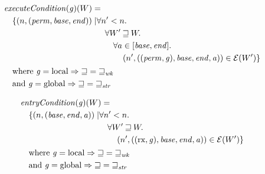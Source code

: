 \documentclass[a4paper]{article}
\newcommand{\var}[1]{\mathit{#1}}
\newcommand{\gl}{\var{g}}
\newcommand{\addr}{\var{a}}
\newcommand{\start}{\var{base}}
\newcommand{\addrend}{\var{end}}
\newcommand{\perm}{\var{perm}}
\newcommand{\plainfun}[2]{
  \ifthenelse{\equal{#2}{}}
             {\mathit{#1}}
             {\mathit{#1}(#2)}
}
\newcommand{\execCond}[1]{\plainfun{executeCondition}{#1}}
\newcommand{\entryCond}[1]{\plainfun{entryCondition}{#1}}
\newcommand{\future}{\mathbin{\sqsupseteq}}
\newcommand{\futurewk}{\mathbin{\sqsupseteq}_{\var{wk}}}
\newcommand{\futurestr}{\mathbin{\sqsupseteq}_{\var{str}}}
\newcommand{\asmType}{\plaindom{AsmType}}
\newcommand{\plaindom}[1]{\mathrm{#1}}
\newcommand{\intr}[2]{\mathcal{#1}}
\newcommand{\exprintr}[1]{\intr{E}{#1}}
\newcommand{\stder}{\exprintr{\asmType}}
\newcommand{\npair}[2][n]{\left(#1,#2 \right)}
\newcommand{\plainperm}[1]{\mathrm{#1}}
\newcommand{\exec}{\plainperm{rx}}
\newcommand{\local}{\plainperm{local}}
\newcommand{\glob}{\plainperm{global}}
\begin{document}
\begin{align*}
  & \execCond{}(\gl)(W) = \\
  & \quad
    \begin{aligned}[t]
      \{ \npair{(\perm,\start,\addrend)} \mid &  \forall n' < n \ldotp\\
      & \quad \forall W' \future W \ldotp\\
      & \qquad\forall a \in [\start,\addrend] \ldotp\\
      & \qquad \quad \npair[n']{((\perm,\gl),\start,\addrend,\addr)} \in \stder(W')\}
    \end{aligned} \\
  & \quad \text{where } \gl = \local \Rightarrow \future = \futurewk \\
  & \quad \text{and } \gl = \glob \Rightarrow \future = \futurestr
\end{align*}

\begin{align*}
  & \entryCond{}(\gl)(W) = \\
  & \quad
    \begin{aligned}[t]
      \{ \npair{(\start,\addrend,\addr)} \mid &  \forall n' < n \ldotp\\
      & \quad \forall W' \future W \ldotp\\
      & \qquad \npair[n']{((\exec,\gl),\start,\addrend,\addr)} \in \stder(W')\}
    \end{aligned} \\
  & \quad \text{where } \gl = \local \Rightarrow \future = \futurewk \\
  & \quad \text{and } \gl = \glob \Rightarrow \future = \futurestr
\end{align*}
\end{document}
